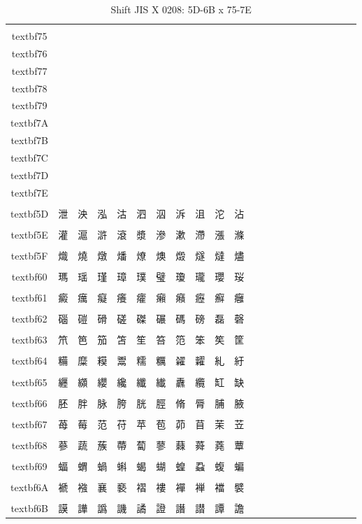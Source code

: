 \begin{table}[H]
\centering
\caption{Shift JIS X 0208: 5D-6B x 75-7E}
\begin{tabular}{|Sc|Sc|Sc|Sc|Sc|Sc|Sc|Sc|Sc|Sc|Sc|}
\hline
 & \\textbf{75} & \\textbf{76} & \\textbf{77} & \\textbf{78} & \\textbf{79} & \\textbf{7A} & \\textbf{7B} & \\textbf{7C} & \\textbf{7D} & \\textbf{7E} \\ \hline
\\textbf{5D} & 泄 & 泱 & 泓 & 沽 & 泗 & 泅 & 泝 & 沮 & 沱 & 沾 \\ \hline
\\textbf{5E} & 灌 & 滬 & 滸 & 滾 & 漿 & 滲 & 漱 & 滯 & 漲 & 滌 \\ \hline
\\textbf{5F} & 熾 & 燒 & 燉 & 燔 & 燎 & 燠 & 燬 & 燧 & 燵 & 燼 \\ \hline
\\textbf{60} & 瑪 & 瑶 & 瑾 & 璋 & 璞 & 璧 & 瓊 & 瓏 & 瓔 & 珱 \\ \hline
\\textbf{61} & 癜 & 癘 & 癡 & 癢 & 癨 & 癩 & 癪 & 癧 & 癬 & 癰 \\ \hline
\\textbf{62} & 碯 & 磑 & 磆 & 磋 & 磔 & 碾 & 碼 & 磅 & 磊 & 磬 \\ \hline
\\textbf{63} & 笊 & 笆 & 笳 & 笘 & 笙 & 笞 & 笵 & 笨 & 笶 & 筐 \\ \hline
\\textbf{64} & 糒 & 糜 & 糢 & 鬻 & 糯 & 糲 & 糴 & 糶 & 糺 & 紆 \\ \hline
\\textbf{65} & 纒 & 纐 & 纓 & 纔 & 纖 & 纎 & 纛 & 纜 & 缸 & 缺 \\ \hline
\\textbf{66} & 胚 & 胖 & 脉 & 胯 & 胱 & 脛 & 脩 & 脣 & 脯 & 腋 \\ \hline
\\textbf{67} & 苺 & 莓 & 范 & 苻 & 苹 & 苞 & 茆 & 苜 & 茉 & 苙 \\ \hline
\\textbf{68} & 蔘 & 蔬 & 蔟 & 蔕 & 蔔 & 蓼 & 蕀 & 蕣 & 蕘 & 蕈 \\ \hline
\\textbf{69} & 蝠 & 蝟 & 蝸 & 蝌 & 蝎 & 蝴 & 蝗 & 蝨 & 蝮 & 蝙 \\ \hline
\\textbf{6A} & 褫 & 襁 & 襄 & 褻 & 褶 & 褸 & 襌 & 褝 & 襠 & 襞 \\ \hline
\\textbf{6B} & 謨 & 譁 & 譌 & 譏 & 譎 & 證 & 譖 & 譛 & 譚 & 譫 \\ \hline
\end{tabular}
\end{table}

